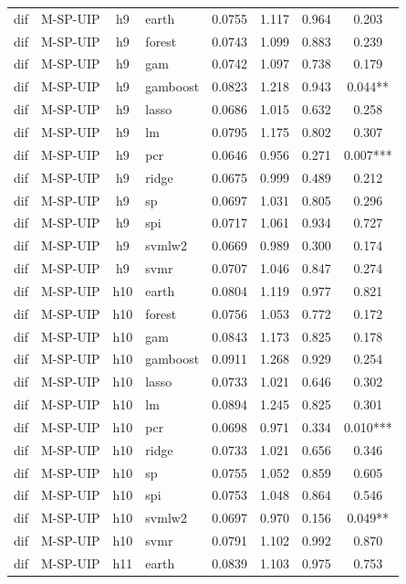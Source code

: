 \begin{ThreePartTable}
\begin{longtable}[t]{llclcccc}
dif & M-SP-UIP & h9 & earth & 0.0755 & 1.117 & 0.964 & 0.203\\
dif & M-SP-UIP & h9 & forest & 0.0743 & 1.099 & 0.883 & 0.239\\
dif & M-SP-UIP & h9 & gam & 0.0742 & 1.097 & 0.738 & 0.179\\
dif & M-SP-UIP & h9 & gamboost & 0.0823 & 1.218 & 0.943 & 0.044**\\
dif & M-SP-UIP & h9 & lasso & 0.0686 & 1.015 & 0.632 & 0.258\\
dif & M-SP-UIP & h9 & lm & 0.0795 & 1.175 & 0.802 & 0.307\\
dif & M-SP-UIP & h9 & pcr & 0.0646 & 0.956 & 0.271 & 0.007***\\
dif & M-SP-UIP & h9 & ridge & 0.0675 & 0.999 & 0.489 & 0.212\\
dif & M-SP-UIP & h9 & sp & 0.0697 & 1.031 & 0.805 & 0.296\\
dif & M-SP-UIP & h9 & spi & 0.0717 & 1.061 & 0.934 & 0.727\\
dif & M-SP-UIP & h9 & svmlw2 & 0.0669 & 0.989 & 0.300 & 0.174\\
dif & M-SP-UIP & h9 & svmr & 0.0707 & 1.046 & 0.847 & 0.274\\
\addlinespace
dif & M-SP-UIP & h10 & earth & 0.0804 & 1.119 & 0.977 & 0.821\\
dif & M-SP-UIP & h10 & forest & 0.0756 & 1.053 & 0.772 & 0.172\\
dif & M-SP-UIP & h10 & gam & 0.0843 & 1.173 & 0.825 & 0.178\\
dif & M-SP-UIP & h10 & gamboost & 0.0911 & 1.268 & 0.929 & 0.254\\
dif & M-SP-UIP & h10 & lasso & 0.0733 & 1.021 & 0.646 & 0.302\\
dif & M-SP-UIP & h10 & lm & 0.0894 & 1.245 & 0.825 & 0.301\\
dif & M-SP-UIP & h10 & pcr & 0.0698 & 0.971 & 0.334 & 0.010***\\
dif & M-SP-UIP & h10 & ridge & 0.0733 & 1.021 & 0.656 & 0.346\\
dif & M-SP-UIP & h10 & sp & 0.0755 & 1.052 & 0.859 & 0.605\\
dif & M-SP-UIP & h10 & spi & 0.0753 & 1.048 & 0.864 & 0.546\\
dif & M-SP-UIP & h10 & svmlw2 & 0.0697 & 0.970 & 0.156 & 0.049**\\
dif & M-SP-UIP & h10 & svmr & 0.0791 & 1.102 & 0.992 & 0.870\\
\addlinespace
dif & M-SP-UIP & h11 & earth & 0.0839 & 1.103 & 0.975 & 0.753\\

\end{longtable}
\end{ThreePartTable}

